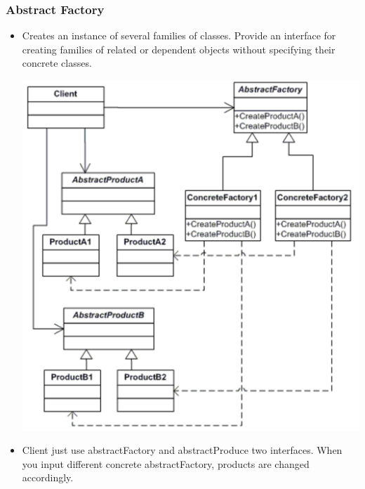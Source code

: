 \documentclass[a4paper,12pt,twoside]{book}
\begin{document}
\subsubsection{Abstract Factory}
\begin{itemize}
\item Creates an instance of several families of classes. Provide an interface for creating families of related or dependent objects without specifying their concrete classes.

\includegraphics[scale=0.75]{pics/abstractFactory.png}

\item Client just use abstractFactory and abstractProduce two interfaces. When you input different concrete abstractFactory, products are changed accordingly. 

\end{itemize}
\end{document}
